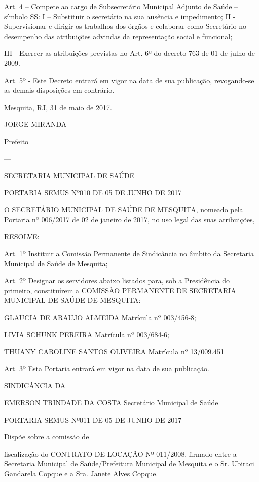 \documentclass{doliberto}
\begin{document}
Art.  4  –  Compete  ao  cargo  de  Subsecretário  Municipal 
Adjunto de Saúde – símbolo SS: 
I – Substituir o secretário na sua ausência e impedimento; 
II  -   Supervisionar  e  dirigir  os  trabalhos  dos  órgãos  e 
colaborar como Secretário no desempenho das atribuições 
advindas da representação social e funcional; 


III  -  Exercer  as  atribuições  previstas  no  Art.  6º  do  decreto 
763 de 01 de julho de 2009. 
  
Art.  5º  -  Este  Decreto  entrará  em  vigor  na  data  de  sua 
publicação,  revogando-se  as  demais  disposições  em 
contrário. 
 

Mesquita, RJ, 31 de maio de 2017. 

 

JORGE MIRANDA 

Prefeito 

---

SECRETARIA MUNICIPAL DE SAÚDE 

PORTARIA SEMUS Nº010 DE 05 DE JUNHO DE 2017 

 
 
O  SECRETÁRIO  MUNICIPAL  DE  SAÚDE  DE  MESQUITA, 
nomeado  pela  Portaria  nº  006/2017  de  02  de  janeiro  de 
2017, no uso legal das suas atribuições, 
 
RESOLVE: 
 
Art. 1º Instituir a Comissão Permanente de Sindicância  no 
âmbito da Secretaria Municipal de Saúde de Mesquita;  
 
Art.  2º  Designar  os  servidores  abaixo  listados  para,  sob  a 
Presidência  do  primeiro,  constituírem  a  COMISSÃO 
PERMANENTE  DE 
SECRETARIA 
MUNICIPAL DE SAÚDE DE MESQUITA:  
 
GLAUCIA DE ARAUJO ALMEIDA 
Matrícula nº 003/456-8; 
 
LIVIA SCHUNK PEREIRA 
Matrícula nº 003/684-6; 
 
THUANY CAROLINE SANTOS OLIVEIRA 
Matrícula nº 13/009.451 
 
Art.  3º  Esta  Portaria  entrará  em  vigor  na  data  de  sua 
publicação. 
 
 

SINDICÂNCIA  DA 

EMERSON TRINDADE DA COSTA 
Secretário Municipal de Saúde 

 PORTARIA SEMUS Nº011 DE 05 DE JUNHO DE 2017 

Dispõe  sobre  a  comissão  de 
 
fiscalização  do 
CONTRATO  DE  LOCAÇÃO  Nº  011/2008,  firmado  entre  a 
Secretaria  Municipal  de  Saúde/Prefeitura  Municipal  de 
Mesquita  e  o  Sr.  Ubiraci  Gandarela  Copque  e  a  Sra.  Janete 
Alves Copque. 
\end{document}
